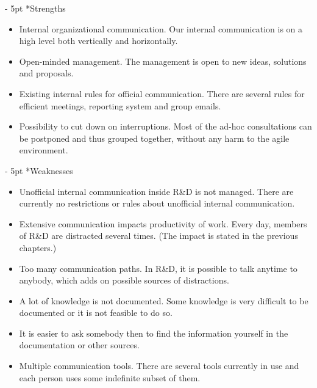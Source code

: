 \documentclass[11pt,singleside]{myfithesis2}
\makeatletter
\renewcommand\paragraph{
   \vspace{-10pt}
   \@startsection{paragraph}{4}{0mm}
      {\baselineskip}
      {- 5pt}
      {\normalfont\normalsize\bfseries}
}
\makeatother
\begin{document}
\paragraph*{Strengths}
\begin{itemize}
	\item Internal organizational communication. Our internal communication is on a high level both vertically and horizontally.
	\item Open-minded management. The management is open to new ideas, solutions and proposals.
	\item Existing internal rules for official communication. There are several rules for efficient meetings, reporting system and group emails.
	\item Possibility to cut down on interruptions. Most of the ad-hoc consultations can be postponed and thus grouped together, without any harm to the agile environment.
\end{itemize}
\paragraph*{Weaknesses}
\begin{itemize}
	\item Unofficial internal communication inside R\&D is not managed. There are currently no restrictions or rules about unofficial internal communication.
	\item Extensive communication impacts productivity of work. Every day, members of R\&D are distracted several times. (The impact is stated in the previous chapters.)
	\item Too many communication paths. In R\&D, it is possible to talk anytime to anybody, which adds on possible sources of distractions.
	\item A lot of knowledge is not documented. Some knowledge is very difficult to be documented or it is not feasible to do so.
	\item It is easier to ask somebody then to find the information yourself in the documentation or other sources.
	\item Multiple communication tools. There are several tools currently in use and each person uses some indefinite subset of them.
\end{itemize}
\end{document}
